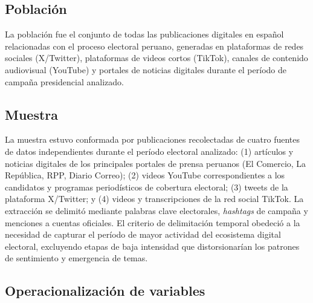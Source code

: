 \subsection{Población}
 
La población fue el conjunto de todas las publicaciones digitales en español relacionadas con el proceso electoral peruano, generadas en plataformas de redes sociales (X/Twitter), plataformas de videos cortos (TikTok), canales de contenido audiovisual (YouTube) y portales de noticias digitales durante el período de campaña presidencial analizado.
 
\subsection{Muestra}
 
La muestra estuvo conformada por publicaciones recolectadas de cuatro fuentes de datos independientes durante el período electoral analizado: (1) artículos y noticias digitales de los principales portales de prensa peruanos (El Comercio, La República, RPP, Diario Correo); (2) videos YouTube correspondientes a los candidatos y programas periodísticos de cobertura electoral; (3) tweets de la plataforma X/Twitter; y (4) videos y transcripciones de la red social TikTok. La extracción se delimitó mediante palabras clave electorales, \textit{hashtags} de campaña y menciones a cuentas oficiales. El criterio de delimitación temporal obedeció a la necesidad de capturar el período de mayor actividad del ecosistema digital electoral, excluyendo etapas de baja intensidad que distorsionarían los patrones de sentimiento y emergencia de temas.

\subsection{Operacionalización de variables}
 
